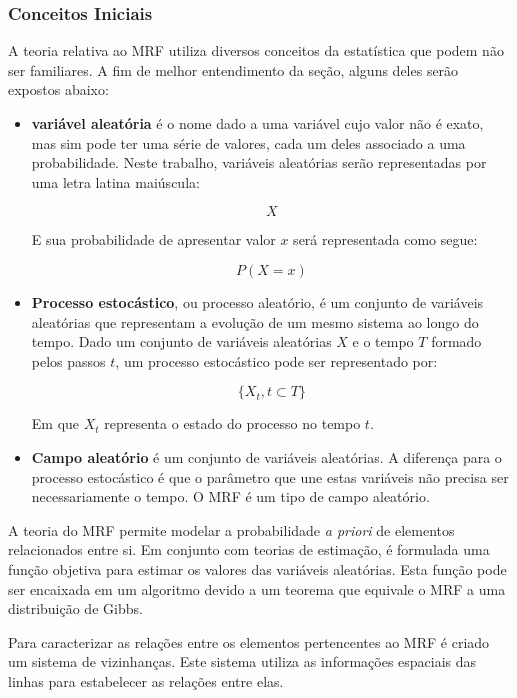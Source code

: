 \subsubsection{Conceitos Iniciais}

A teoria relativa ao MRF utiliza diversos conceitos da estatística que podem não ser familiares. A fim de melhor entendimento da seção, alguns deles serão expostos abaixo: 

\begin{itemize}

\item \textbf{variável aleatória} é o nome dado a uma variável cujo valor não é exato, mas sim pode ter uma série de valores, cada um deles associado a uma probabilidade. Neste trabalho, variáveis aleatórias serão representadas por uma letra latina maiúscula:

$$ X $$

E sua probabilidade de apresentar valor $x$ será representada como segue:

$$ P(X = x)$$

\item \textbf{Processo estocástico}, ou processo aleatório, é um conjunto de variáveis aleatórias que representam a evolução de um mesmo sistema ao longo do tempo. Dado um conjunto de variáveis aleatórias $X$ e o tempo $T$ formado pelos passos $t$, um processo estocástico pode ser representado por:

$$ \{X_t,t\subset T\}$$

Em que $X_t$ representa o estado do processo no tempo $t$.

\item \textbf{Campo aleatório} é um conjunto de variáveis aleatórias. A diferença para o processo estocástico é que o parâmetro que une estas variáveis não precisa ser necessariamente o tempo. O MRF é um tipo de campo aleatório.

\end{itemize}

A teoria do MRF permite modelar a probabilidade \textit{a priori} de elementos relacionados entre si. Em conjunto com teorias de estimação, é formulada uma função objetiva para estimar os valores das variáveis aleatórias. Esta função pode ser encaixada em um algoritmo devido a um teorema que equivale o MRF a uma distribuição de Gibbs.

Para caracterizar as relações entre os elementos pertencentes ao MRF é criado um sistema de vizinhanças. Este sistema utiliza as informações espaciais das linhas para estabelecer as relações entre elas.

